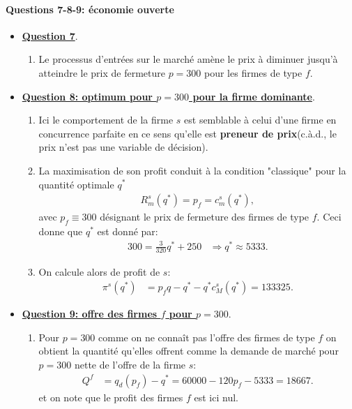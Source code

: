 \documentclass[notes, ignorenonframetext, compress, 9pt, xcolor=svgnames, aspectratio=169]{beamer}
\begin{document}
  \begin{frame}[allowframebreaks]{\insertsection}
     \framesubtitle{Questions 7-8-9: économie ouverte}
  \begin{itemize}
  \item \underline{\textbf{Question 7}}.
  \begin{enumerate}[$\cdot$]
  \item Le processus d'entrées sur le marché amène le prix à diminuer jusqu'à atteindre le prix de fermeture $p=300$ pour les firmes de type $f$.
  \end{enumerate}
  \item  \underline{\textbf{Question 8: optimum pour $p=300$ pour la firme dominante}}.
  \begin{enumerate}[$\cdot$]
  \item Ici le comportement de la firme $s$ est semblable à celui d'une firme en concurrence parfaite en ce sens qu'elle est \textbf{preneur de prix}(c.à.d., le prix n'est pas une variable de décision).
  \item La maximisation de son profit conduit à la condition "classique"  pour la quantité optimale $q^*$
  \begin{align*}
  R_m^s(q^*) = p_f = c_m^s(q^*),
  \end{align*}
  avec $p_f \equiv 300$ désignant le prix de fermeture des firmes de type $f$. Ceci donne que $q^*$ est donné par:
  \begin{align*}
  300= \frac{3}{320}q^* +250 &\Rightarrow  q^* \approx 5333.
  \end{align*}
  \item On calcule alors de profit de $s$:
  \begin{align*}
  \pi^s(q^*) &= p_fq -q^* - q^*c_M^s(q^*) = 133325.
  \end{align*}
  \end{enumerate}
  \item  \underline{\textbf{Question 9: offre des firmes $f$ pour $p=300$}}.
  \begin{enumerate}[$\cdot$]
  \item Pour $p=300$ comme on ne connaît pas l'offre des firmes de type $f$ on obtient la quantité qu'elles offrent comme la demande de marché pour $p=300$ nette de l'offre de la firme $s$:
  \begin{align}
  Q^f &= q_d(p_f) - q^* = 60000 - 120p_f - 5333 = 18667.
  \end{align}
  et on note que le profit des firmes $f$ est ici nul.
  \end{enumerate}
  \end{itemize}
  \end{frame}
  
\end{document}
